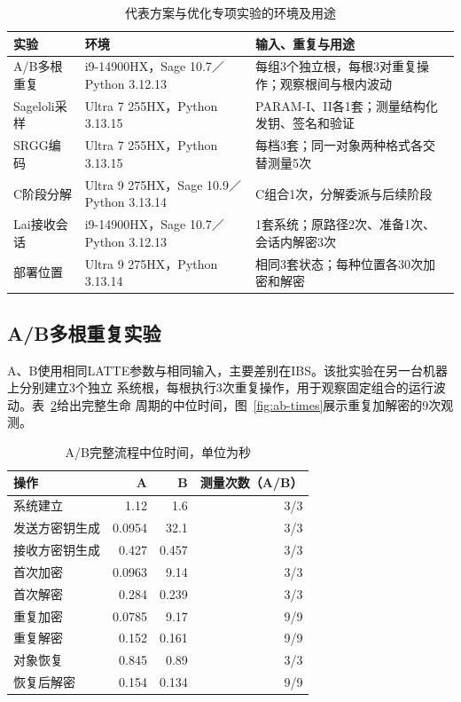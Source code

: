 \begin{table}[H]
\centering\small
\caption{代表方案与优化专项实验的环境及用途}
\label{tab:specialized-environments}
\begin{tabularx}{\textwidth}{@{}>{\raggedright\arraybackslash}p{}>{\raggedright\arraybackslash}p{}>{\raggedright\arraybackslash}X@{}}
\toprule
\rowcolor{black!8} 实验 & 环境 & 输入、重复与用途 \\
\midrule
A/B多根重复 & i9-14900HX，Sage 10.7／Python 3.12.13 & 每组3个独立根，每根3对重复操作；观察根间与根内波动 \\
Sageloli采样 & Ultra 7 255HX，Python 3.13.15 & PARAM-I、II各1套；测量结构化发钥、签名和验证 \\
SRGG编码 & Ultra 7 255HX，Python 3.13.15 & 每档3套；同一对象两种格式各交替测量5次 \\
C阶段分解 & Ultra 9 275HX，Sage 10.9／Python 3.13.14 & C组合1次，分解委派与后续阶段 \\
Lai接收会话 & i9-14900HX，Sage 10.7／Python 3.12.13 & 1套系统；原路径2次、准备1次、会话内解密3次 \\
部署位置 & Ultra 9 275HX，Python 3.13.14 & 相同3套状态；每种位置各30次加密和解密 \\
\bottomrule
\end{tabularx}
\end{table}

\subsection{A/B多根重复实验}
A、B使用相同LATTE参数与相同输入，主要差别在IBS。该批实验在另一台机器上分别建立3个独立
系统根，每根执行3次重复操作，用于观察固定组合的运行波动。表~\ref{tab:ab-times}给出完整生命
周期的中位时间，图~\ref{fig:ab-times}展示重复加解密的9次观测。

\begin{table}[H]
\centering\small
\caption{A/B完整流程中位时间，单位为秒}
\label{tab:ab-times}
\begin{tabular}{@{}lrrr@{}}
\toprule
\rowcolor{black!8} 操作 & A & B & 测量次数（A/B） \\
\midrule
系统建立 & 1.12 & 1.6 & 3/3 \\
发送方密钥生成 & 0.0954 & 32.1 & 3/3 \\
接收方密钥生成 & 0.427 & 0.457 & 3/3 \\
首次加密 & 0.0963 & 9.14 & 3/3 \\
首次解密 & 0.284 & 0.239 & 3/3 \\
重复加密 & 0.0785 & 9.17 & 9/9 \\
重复解密 & 0.152 & 0.161 & 9/9 \\
对象恢复 & 0.845 & 0.89 & 3/3 \\
恢复后解密 & 0.154 & 0.134 & 9/9 \\
\bottomrule
\end{tabular}
\end{table}

